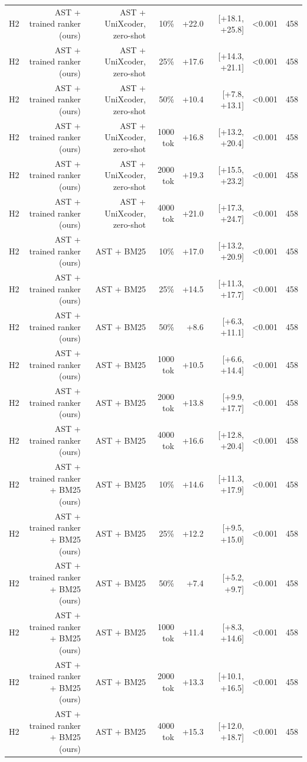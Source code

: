 \begin{tabular}{lrrrrrrr}
H2 & AST + trained ranker (ours) & AST + UniXcoder, zero-shot & 10\% & +22.0 & [+18.1, +25.8] & <0.001 & 458 \\
H2 & AST + trained ranker (ours) & AST + UniXcoder, zero-shot & 25\% & +17.6 & [+14.3, +21.1] & <0.001 & 458 \\
H2 & AST + trained ranker (ours) & AST + UniXcoder, zero-shot & 50\% & +10.4 & [+7.8, +13.1] & <0.001 & 458 \\
H2 & AST + trained ranker (ours) & AST + UniXcoder, zero-shot & 1000 tok & +16.8 & [+13.2, +20.4] & <0.001 & 458 \\
H2 & AST + trained ranker (ours) & AST + UniXcoder, zero-shot & 2000 tok & +19.3 & [+15.5, +23.2] & <0.001 & 458 \\
H2 & AST + trained ranker (ours) & AST + UniXcoder, zero-shot & 4000 tok & +21.0 & [+17.3, +24.7] & <0.001 & 458 \\
H2 & AST + trained ranker (ours) & AST + BM25 & 10\% & +17.0 & [+13.2, +20.9] & <0.001 & 458 \\
H2 & AST + trained ranker (ours) & AST + BM25 & 25\% & +14.5 & [+11.3, +17.7] & <0.001 & 458 \\
H2 & AST + trained ranker (ours) & AST + BM25 & 50\% & +8.6 & [+6.3, +11.1] & <0.001 & 458 \\
H2 & AST + trained ranker (ours) & AST + BM25 & 1000 tok & +10.5 & [+6.6, +14.4] & <0.001 & 458 \\
H2 & AST + trained ranker (ours) & AST + BM25 & 2000 tok & +13.8 & [+9.9, +17.7] & <0.001 & 458 \\
H2 & AST + trained ranker (ours) & AST + BM25 & 4000 tok & +16.6 & [+12.8, +20.4] & <0.001 & 458 \\
H2 & AST + trained ranker + BM25 (ours) & AST + BM25 & 10\% & +14.6 & [+11.3, +17.9] & <0.001 & 458 \\
H2 & AST + trained ranker + BM25 (ours) & AST + BM25 & 25\% & +12.2 & [+9.5, +15.0] & <0.001 & 458 \\
H2 & AST + trained ranker + BM25 (ours) & AST + BM25 & 50\% & +7.4 & [+5.2, +9.7] & <0.001 & 458 \\
H2 & AST + trained ranker + BM25 (ours) & AST + BM25 & 1000 tok & +11.4 & [+8.3, +14.6] & <0.001 & 458 \\
H2 & AST + trained ranker + BM25 (ours) & AST + BM25 & 2000 tok & +13.3 & [+10.1, +16.5] & <0.001 & 458 \\
H2 & AST + trained ranker + BM25 (ours) & AST + BM25 & 4000 tok & +15.3 & [+12.0, +18.7] & <0.001 & 458 \\
\bottomrule
\end{tabular}
